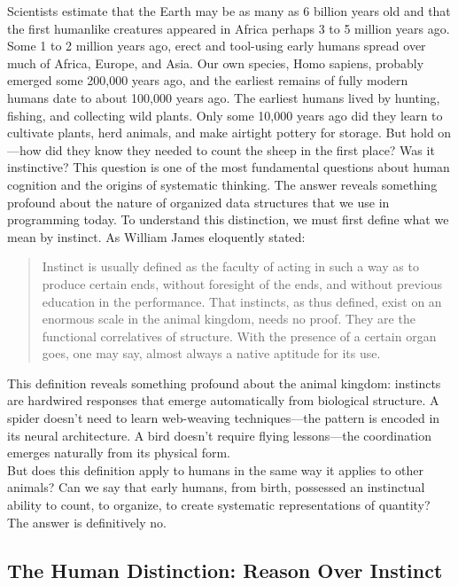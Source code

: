 Scientists estimate that the Earth may be as many as 6 billion years old and that the first humanlike creatures appeared in Africa perhaps 3 to 5 million years ago. Some 1 to 2 million years ago, erect and tool-using early humans spread over much of Africa, Europe, and Asia. Our own species, Homo sapiens, probably emerged some 200,000 years ago, and the earliest remains of fully modern humans date to about 100,000 years ago. The earliest humans lived by hunting, fishing, and collecting wild plants. Only some 10,000 years ago did they learn to cultivate plants, herd animals, and make airtight pottery for storage. But hold on—how did they know they needed to count the sheep in the first place? Was it instinctive?
This question is one of the most fundamental questions about human cognition and the origins of systematic thinking. The answer reveals something profound about the nature of organized data structures that we use in programming today. To understand this distinction, we must first define what we mean by instinct. As William James eloquently stated:
\begin{quote}
	Instinct is usually defined as the faculty of acting in such a way as to produce certain ends, without foresight of the ends, and without previous education in the performance. That instincts, as thus defined, exist on an enormous scale in the animal kingdom, needs no proof. They are the functional correlatives of structure. With the presence of a certain organ goes, one may say, almost always a native aptitude for its use.
\end{quote}
This definition reveals something profound about the animal kingdom: instincts are hardwired responses that emerge automatically from biological structure. A spider doesn't need to learn web-weaving techniques—the pattern is encoded in its neural architecture. A bird doesn't require flying lessons—the coordination emerges naturally from its physical form.\\
But does this definition apply to humans in the same way it applies to other animals? Can we say that early humans, from birth, possessed an instinctual ability to count, to organize, to create systematic representations of quantity? The answer is definitively no.

\subsection{The Human Distinction: Reason Over Instinct}

